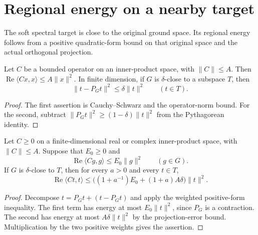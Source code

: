 \section{Regional energy on a nearby target}

The soft spectral target is close to the original ground space. Its
regional energy follows from a positive quadratic-form bound on that
original space and the actual orthogonal projection.

\begin{lemma}
    \label{lem:projection_quadratic_bounds}
    \leanok
    Let $C$ be a bounded operator on an inner-product space, with
    $\|C\|\le A$. Then
    $\operatorname{Re}\langle Cx,x\rangle\le A\|x\|^2$.
    In finite dimension, if $G$ is $\delta$-close to a subspace $T$, then
    \[
        \|t-P_Gt\|^2\le\delta\|t\|^2\qquad(t\in T).
    \]
\end{lemma}
\begin{proof}\leanok
    The first assertion is Cauchy--Schwarz and the operator-norm bound.
    For the second, subtract
    $\|P_Gt\|^2\ge(1-\delta)\|t\|^2$ from the Pythagorean identity.
\end{proof}

\begin{lemma}
    \label{lem:close_subspace_positive_energy}
    \leanok
    Let $C\ge0$ on a finite-dimensional real or complex inner-product
    space, with $\|C\|\le A$. Suppose that $E_0\ge0$ and
    \[
        \operatorname{Re}\langle Cg,g\rangle\le E_0\|g\|^2\qquad(g\in G).
    \]
    If $G$ is $\delta$-close to $T$, then for every $a>0$ and every $t\in T$,
    \[
        \operatorname{Re}\langle Ct,t\rangle
        \le\bigl((1+a^{-1})E_0+(1+a)A\delta\bigr)\|t\|^2.
    \]
\end{lemma}
\begin{proof}\leanok
    Decompose $t=P_Gt+(t-P_Gt)$ and apply the weighted positive-form
    inequality. The first term has energy at most $E_0\|t\|^2$,
    since $P_G$ is a contraction. The second has energy at most
    $A\delta\|t\|^2$ by the projection-error bound. Multiplication by
    the two positive weights gives the assertion.
\end{proof}

